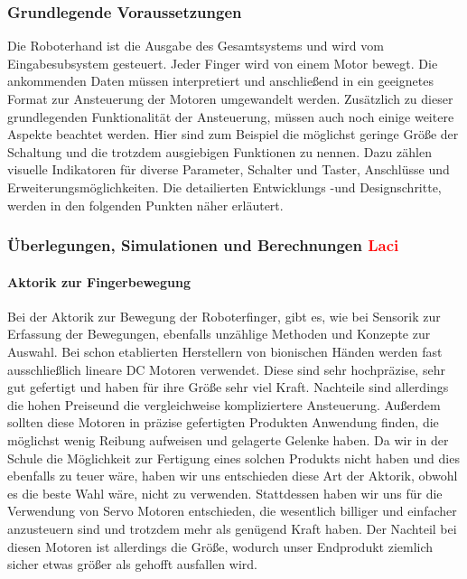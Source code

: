 \documentclass[titlepage,12pt,twoside]{article}
\begin{document}
\subsubsection{Grundlegende Voraussetzungen}
Die Roboterhand ist die Ausgabe des Gesamtsystems und wird vom Eingabesubsystem gesteuert. Jeder Finger wird von einem Motor 
bewegt. Die ankommenden Daten müssen interpretiert und anschließend in ein geeignetes Format zur Ansteuerung der Motoren
umgewandelt werden. Zusätzlich zu dieser grundlegenden Funktionalität der Ansteuerung, müssen auch noch einige weitere Aspekte
beachtet werden. Hier sind zum Beispiel die möglichst geringe Größe der Schaltung und die trotzdem ausgiebigen Funktionen 
zu nennen. Dazu zählen visuelle Indikatoren für diverse Parameter, Schalter und Taster, Anschlüsse und Erweiterungsmöglichkeiten.
Die detailierten Entwicklungs -und Designschritte, werden in den folgenden Punkten näher erläutert. \\

\subsubsection{Überlegungen, Simulationen und Berechnungen \textcolor{red}{Laci}}
\paragraph{Aktorik zur Fingerbewegung}
\hfill \break
\hfill \break
Bei der Aktorik zur Bewegung der Roboterfinger, gibt es, wie bei Sensorik zur Erfassung der Bewegungen, ebenfalls unzählige Methoden
und Konzepte zur Auswahl. Bei schon etablierten Herstellern von bionischen Händen werden fast ausschließlich lineare DC Motoren 
verwendet. Diese sind sehr hochpräzise, sehr gut gefertigt und haben für ihre Größe sehr viel Kraft. Nachteile sind allerdings
die hohen Preiseund die vergleichweise kompliziertere Ansteuerung. Außerdem sollten diese Motoren in präzise gefertigten Produkten
Anwendung finden, die möglichst wenig Reibung aufweisen und gelagerte Gelenke haben. Da wir in der Schule die Möglichkeit zur Fertigung 
eines solchen Produkts nicht haben und dies ebenfalls zu teuer wäre, haben wir uns entschieden diese Art der Aktorik, obwohl es die beste Wahl wäre,
nicht zu verwenden. Stattdessen haben wir uns für die Verwendung von Servo Motoren entschieden, die wesentlich billiger und einfacher anzusteuern sind und trotzdem mehr als
genügend Kraft haben. Der Nachteil bei diesen Motoren ist allerdings die Größe, wodurch unser Endprodukt ziemlich sicher etwas größer als gehofft
ausfallen wird. \\
\end{document}
